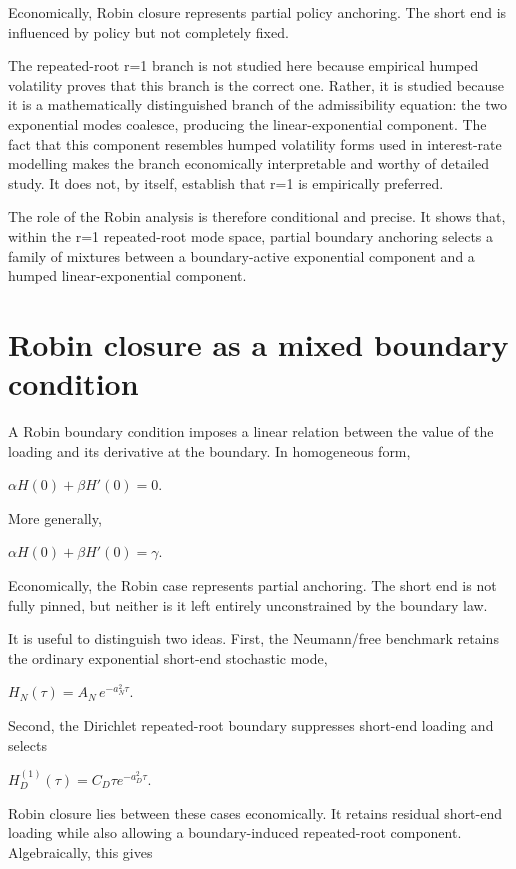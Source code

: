 \documentclass[11pt,oneside]{book}
\begin{document}
Economically, Robin closure represents partial policy anchoring. The
short end is influenced by policy but not completely fixed.

The repeated-root r=1 branch is not studied here because empirical
humped volatility proves that this branch is the correct one. Rather, it
is studied because it is a mathematically distinguished branch of the
admissibility equation: the two exponential modes coalesce, producing
the linear-exponential component. The fact that this component resembles
humped volatility forms used in interest-rate modelling makes the branch
economically interpretable and worthy of detailed study. It does not, by
itself, establish that r=1 is empirically preferred.

The role of the Robin analysis is therefore conditional and precise. It
shows that, within the r=1 repeated-root mode space, partial boundary
anchoring selects a family of mixtures between a boundary-active
exponential component and a humped linear-exponential component.

\section{Robin closure as a mixed boundary
condition}\label{robin-closure-as-a-mixed-boundary-condition}

A Robin boundary condition imposes a linear relation between the value
of the loading and its derivative at the boundary. In homogeneous form,

$\alpha H(0)+\beta H'(0)=0$.

More generally,

$\alpha H(0)+\beta H'(0)=\gamma$.

Economically, the Robin case represents partial anchoring. The short end
is not fully pinned, but neither is it left entirely unconstrained by
the boundary law.

It is useful to distinguish two ideas. First, the Neumann/free benchmark
retains the ordinary exponential short-end stochastic mode,

$H_N(\tau)=A_N\,e^{-a_N^2\tau}$.

Second, the Dirichlet repeated-root boundary suppresses short-end
loading and selects

$H_D^{(1)}(\tau)=C_D\tau e^{-a_D^2\tau}$.

Robin closure lies between these cases economically. It retains residual
short-end loading while also allowing a boundary-induced repeated-root
component. Algebraically, this gives
\end{document}

